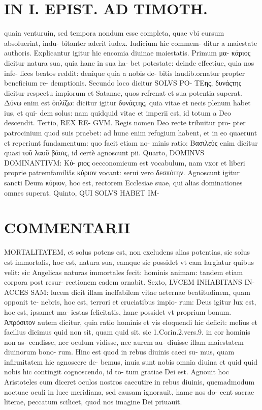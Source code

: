 \documentclass{article}
\begin{document}
\begin{pages}
\section*{IN I. EPIST. AD TIMOTH. }
\marginpar{[ p.165 ]}\pstart quain venturuin, sed tempora nondum esse completa, quae vbi cursum absoluerint, indu- bitanter aderit iudex. Iudicium hic commem- ditur a maiestate authoris. Explicantur igitur hic encomia diuinae maiestatis. Primum μα- κάριος dicitur natura sua, quia hanc in sua ha- bet potestate: deinde effectiue, quia nos infe- lices beatos reddit: denique quia a nobis de- bitis laudib.ornatur propter beneficium re- demptionis. Secundo loco dicitur SOLVS PO- ΤEης, δυνάςτης dicitur respectu impiorum et Satanae, quos refrenat et sua potentia superat. Δύνω enim est ὁπλίζω: dicitur igitur δυνάςτης, quia vitae et necis plenum habet ius, et qui- dem solus: nam quidquid vitae et imperii est, id totum a Deo descendit. Tertio, REX RE- GVM. Regis nomen Deo recte tribuitur pro- pter patrocinium quod suis praebet: ad hunc enim refugium habent, et in eo quaerunt et reperiunt fundamentum: quo facit etiam no- minis ratio: Βασιλεὺς enim dicitur quasi τοῦ λαοῦ βάσις, id certè agnoscunt pii.  \pend\pstart Quarto, DOMINVS DOMINANTIVM: Κύ- ριος oecconomicum est vocabulum, nam vxor et liberi proprie patremfamiliâs κύριον vocant: serui vero δεσπότην. Agnoscunt igitur sancti Deum κύριον, hoc est, rectorem Ecclesiae suae, qui alias dominationes omnes superat.  \pend\pstart Quinto, QUI SOLVS HABET IM-  \pend
\section*{COMMENTARII }
\marginpar{[ p.166 ]}\pstart MORTALITATEM, et solus potens est, non excludens alias potentias, sic solus est immortalis, hoc est, natura sua, eamque sic possidet vt eam largiatur quibus velit: sic Angelicas naturas immortales fecit: hominis animam: tandem etiam corpora post resur- rectionem eadem ornabit.  \pend\pstart Sexto, LVCEM INHABITANS IN- ACCES SAM: lucem dicit illam ineffabilem vitae aeternae beatitudinem, quam opponit te- nebris, hoc est, terrori et cruciatibus impio- rum: Deus igitur lux est, hoc est, ipsamet ma- iestas felicitatis, hanc possidet vt proprium bonum. Ἀπρόσιτον autem dicitur, quia ratio hominis et vis eloquendi hic deficit: melius et facilius dicimus quid non sit, quam quid sit. sic 1.Corin.2.vers.9. in cor hominis non as- cendisse, nec oculum vidisse, nec aurem au- diuisse illam maiestatem diuinorum bono- rum. Hinc est quod in rebus diuinis caeci su- mus, quam infirmitatem hic agnoscere de- bemus, inuia sunt nobis omnia diuina et quid quid nobis hic contingit cognoscendo, id to- tum gratiae Dei est. Agnouit hoc Aristoteles cum diceret oculos nostros caecutire in rebus diuinis, quemadmodum noctuae oculi in luce meridiana, sed causam ignorauit, hamc nos do- cent sacrae literae, peccatum scilicet, quod nos imagine Dei priuauit.  \pend

\end{pages}
\end{document}
